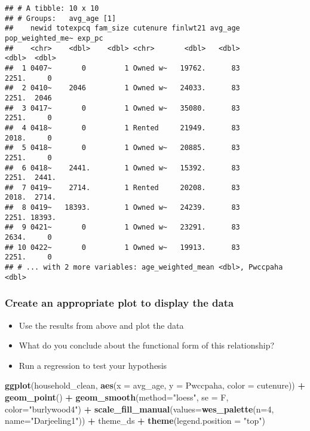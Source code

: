 \documentclass[
]{article}
\newenvironment{Shaded}{\begin{snugshade}}{\end{snugshade}}
\newcommand{\DataTypeTok}[1]{\textcolor[rgb]{0.13,0.29,0.53}{#1}}
\newcommand{\DecValTok}[1]{\textcolor[rgb]{0.00,0.00,0.81}{#1}}
\newcommand{\KeywordTok}[1]{\textcolor[rgb]{0.13,0.29,0.53}{\textbf{#1}}}
\newcommand{\NormalTok}[1]{#1}
\newcommand{\OperatorTok}[1]{\textcolor[rgb]{0.81,0.36,0.00}{\textbf{#1}}}
\newcommand{\StringTok}[1]{\textcolor[rgb]{0.31,0.60,0.02}{#1}}
\providecommand{\tightlist}{%
  \setlength{\itemsep}{0pt}\setlength{\parskip}{0pt}}
\begin{document}
\begin{verbatim}
## # A tibble: 10 x 10
## # Groups:   avg_age [1]
##    newid totexpcq fam_size cutenure finlwt21 avg_age pop_weighted_me~ exp_pc
##    <chr>    <dbl>    <dbl> <chr>       <dbl>   <dbl>            <dbl>  <dbl>
##  1 0407~       0         1 Owned w~   19762.      83            2251.     0 
##  2 0410~    2046         1 Owned w~   24033.      83            2251.  2046 
##  3 0417~       0         1 Owned w~   35080.      83            2251.     0 
##  4 0418~       0         1 Rented     21949.      83            2018.     0 
##  5 0418~       0         1 Owned w~   20885.      83            2251.     0 
##  6 0418~    2441.        1 Owned w~   15392.      83            2251.  2441.
##  7 0419~    2714.        1 Rented     20208.      83            2018.  2714.
##  8 0419~   18393.        1 Owned w~   24239.      83            2251. 18393.
##  9 0421~       0         1 Owned w~   23291.      83            2634.     0 
## 10 0422~       0         1 Owned w~   19913.      83            2251.     0 
## # ... with 2 more variables: age_weighted_mean <dbl>, Pwccpaha <dbl>
\end{verbatim}

\hypertarget{create-an-appropriate-plot-to-display-the-data}{%
\subsubsection{Create an appropriate plot to display the
data}\label{create-an-appropriate-plot-to-display-the-data}}

\begin{itemize}
\tightlist
\item
  Use the results from above and plot the data
\item
  What do you conclude about the functional form of this relationship?
\item
  Run a regression to test your hypothesis
\end{itemize}

\begin{Shaded}
\begin{Highlighting}[]
\KeywordTok{ggplot}\NormalTok{(household_clean, }\KeywordTok{aes}\NormalTok{(}\DataTypeTok{x =}\NormalTok{ avg_age, }\DataTypeTok{y =}\NormalTok{ Pwccpaha, }\DataTypeTok{color =}\NormalTok{ cutenure)) }\OperatorTok{+}\StringTok{ }
\StringTok{  }\KeywordTok{geom_point}\NormalTok{() }\OperatorTok{+}
\StringTok{  }\KeywordTok{geom_smooth}\NormalTok{(}\DataTypeTok{method=}\StringTok{"loess"}\NormalTok{, }\DataTypeTok{se =}\NormalTok{ F, }\DataTypeTok{color=}\StringTok{"burlywood4"}\NormalTok{)  }\OperatorTok{+}
\StringTok{  }\KeywordTok{scale_fill_manual}\NormalTok{(}\DataTypeTok{values=}\KeywordTok{wes_palette}\NormalTok{(}\DataTypeTok{n=}\DecValTok{4}\NormalTok{, }\DataTypeTok{name=}\StringTok{"Darjeeling1"}\NormalTok{)) }\OperatorTok{+}
\StringTok{  }\NormalTok{theme_ds }\OperatorTok{+}
\StringTok{  }\KeywordTok{theme}\NormalTok{(}\DataTypeTok{legend.position =} \StringTok{"top"}\NormalTok{)}
\end{Highlighting}
\end{Shaded}
\end{document}
